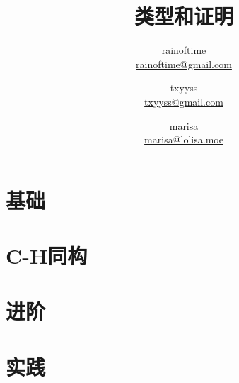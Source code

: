 

\hypersetup{CJKbookmarks=true}


\author{
    rainoftime \\ \href {mailto:rainoftime@gmail.com}{rainoftime@gmail.com} \and
    txyyss \\ \href {mailto:txyyss@gmail.com}{txyyss@gmail.com} \and
    marisa \\ \href {mailto:marisa@lolisa.moe}{marisa@lolisa.moe}}

\title{类型和证明}
\date{}
\maketitle
 {\thispagestyle{empty}
  \vspace*{-2em}
  \tableofcontents
 }



\part{基础}




\part{C-H同构}





\part{进阶}



\part{实践}





